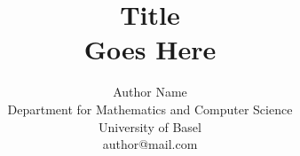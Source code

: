 \documentclass[twocolumn, 10pt]{article}
\begin{document}
    \title{\textbf{Title\\Goes Here}}
    \author{
        Author Name\\
        Department for Mathematics and Computer Science\\
        University of Basel\\
        author@mail.com
    }

    \maketitle

    

    
    
    
    
    

    \printbibliography

    \begin{appendices}
        
    \end{appendices}
\end{document}
